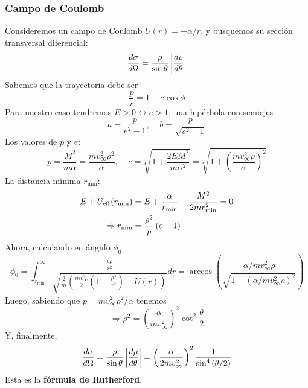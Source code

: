 \documentclass[]{article}
\numberwithin{equation}{section}
\begin{document}
\subsubsection{Campo de Coulomb}
Consideremos un campo de Coulomb \(U(r) = - \alpha/r\), y busquemos su sección transversal diferencial:
\begin{equation*}
	\dfrac{d \sigma}{d \Omega} = \frac{\rho}{\sin\theta}\left|\dfrac{d \rho}{d \theta}\right|
\end{equation*}
Sabemos que la trayectoria debe ser
\begin{equation*}
	\frac{p}{r} = 1 + e \cos\phi
\end{equation*}
Para nuestro caso tendremos \(E > 0 \leftrightarrow e > 1\), una hipérbola con semiejes
\begin{equation*}
	a = \frac{p}{e^2 - 1}, ~~~~~ b = \frac{p}{\sqrt{e^2 - 1}}
\end{equation*}
Los valores de \(p\) y \(e\):
\begin{equation}
	p = \frac{M^2}{m\alpha} = \frac{m v_\infty^2 \rho^2}{\alpha}, ~~~~~e = \sqrt{1 + \frac{2 E M^2}{m \alpha^2}} = \sqrt{1 + \left(\frac{m v_\infty^2 \rho}{\alpha}\right)^2} 
\end{equation}
La distancia mínima \(r_\mathrm{min}\):
\begin{align}
	E + U_\mathrm{eff}(r_\mathrm{min}) &= E + \frac{\alpha}{r_\mathrm{min}} - \frac{M^2}{2 m r_\mathrm{min}^2} = 0\nonumber\\
	\Rightarrow r_\mathrm{min} &= \frac{\rho^2}{p}\left(e - 1\right)
\end{align}
Ahora, calculando en ángulo \(\phi_0\):
\begin{equation}
	\phi_0 = \int_{r_\mathrm{min}}^{\infty} \frac{\frac{v \rho}{r^2}}{\sqrt{\frac{2}{m} \left(\frac{m v_\infty^2}{2}\left(1 - \frac{\rho^2}{r^2}\right) - U(r)\right)}} dr = \arccos\left(\frac{\alpha/mv_\infty^2\rho}{\sqrt{1 + \left(\alpha/mv_\infty^2\rho\right)^2}}\right)
\end{equation}
Luego, sabiendo que \(p = m v_\infty^2 \rho^2/\alpha\) tenemos
\begin{equation}
	\Rightarrow \rho^2 = \left(\frac{\alpha}{m v_\infty^2}\right)^2 \cot^2\frac{\theta}{2}
\end{equation}
Y, finalmente,
\begin{equation}
	\dfrac{d \sigma}{d \Omega} = \frac{\rho}{\sin\theta}\left|\dfrac{d \rho}{d \theta}\right| = \left(\frac{\alpha}{2 m v_\infty^2}\right)^2 \frac{1}{\sin^4\left(\theta/2\right)}
\end{equation}
Esta es la \textbf{fórmula de Rutherford}.
\end{document}
